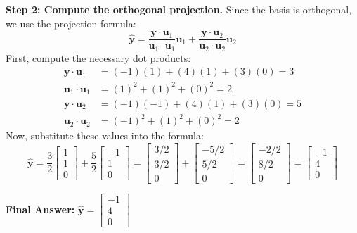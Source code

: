 \documentclass[11pt, letterpaper]{article}
\theoremstyle{definition}
\theoremstyle{remark}
\begin{document}
\textbf{Step 2: Compute the orthogonal projection.}
Since the basis is orthogonal, we use the projection formula:
\[ \hat{\mathbf{y}} = \frac{\mathbf{y} \cdot \mathbf{u}_1}{\mathbf{u}_1 \cdot \mathbf{u}_1}\mathbf{u}_1 + \frac{\mathbf{y} \cdot \mathbf{u}_2}{\mathbf{u}_2 \cdot \mathbf{u}_2}\mathbf{u}_2 \]
First, compute the necessary dot products:
\begin{align*}
    \mathbf{y} \cdot \mathbf{u}_1 &= (-1)(1) + (4)(1) + (3)(0) = 3 \\
    \mathbf{u}_1 \cdot \mathbf{u}_1 &= (1)^2 + (1)^2 + (0)^2 = 2 \\
    \mathbf{y} \cdot \mathbf{u}_2 &= (-1)(-1) + (4)(1) + (3)(0) = 5 \\
    \mathbf{u}_2 \cdot \mathbf{u}_2 &= (-1)^2 + (1)^2 + (0)^2 = 2
\end{align*}
Now, substitute these values into the formula:
\[ \hat{\mathbf{y}} = \frac{3}{2} \begin{bmatrix} 1 \\ 1 \\ 0 \end{bmatrix} + \frac{5}{2} \begin{bmatrix} -1 \\ 1 \\ 0 \end{bmatrix} = \begin{bmatrix} 3/2 \\ 3/2 \\ 0 \end{bmatrix} + \begin{bmatrix} -5/2 \\ 5/2 \\ 0 \end{bmatrix} = \begin{bmatrix} -2/2 \\ 8/2 \\ 0 \end{bmatrix} = \begin{bmatrix} -1 \\ 4 \\ 0 \end{bmatrix} \]

\textbf{Final Answer:} $\hat{\mathbf{y}} = \begin{bmatrix} -1 \\ 4 \\ 0 \end{bmatrix}$

\vspace{1em}
\end{document}
